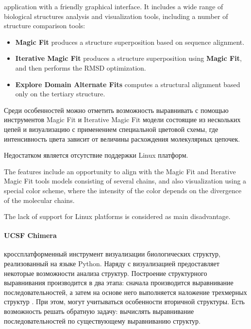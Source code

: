 \documentclass[a4paper, 12pt, titlepage, utf8]{extarticle}
\begin{document}
\begin{original}
\begin{original}
application with a friendly graphical interface. It includes a wide range of
biological structures analysis and visualization tools, including a number of
structure comparison tools:
\begin{itemize}
    \item \textbf{Magic Fit} produces a structure superposition based on
sequence alignment.
    \item \textbf{Iterative Magic Fit} produces a structure superposition using
\textbf{Magic Fit}, and then performs the RMSD optimization.
    \item \textbf{Explore Domain Alternate Fits} computes a structural alignment
based only on the tertiary structure.
\end{itemize}

\begin{original}
Среди особенностей можно отметить возможность выравнивать с помощью инструментов
Magic Fit и Iterative Magic Fit модели состоящие из нескольких цепей и
визуализацию с применением специальной цветовой схемы, где интенсивность цвета
зависит от величины расхождения молекулярных цепочек.

Недостатком является отсутствие поддержки Linux платформ.
\end{original}

The features include an opportunity to align with the Magic Fit and Iterative
Magic Fit tools  models consisting of several chains, and also visualization
using a special color scheme, where the intensity of the color depends on the
divergence of the molecular chains.

The lack of support for Linux platforms is considered as main disadvantage.

\paragraph{UCSF Chimera \cite{chimera}}
\begin{original}
кроссплатформенный инструмент визуализации биологических структур, реализованный
на языке Python. Наряду с визуализацией предоставляет некоторые возможности
анализа структур. Построение структурного выравнивания производится в два этапа:
сначала производится выравнивание последовательностей, а затем на основе него
выполняется наложение трехмерных структур \cite{chimera-alignment}. При этом,
могут учитываться особенности вторичной структуры. Есть возможность решать
обратную задачу: вычислять выравнивание последовательностей по существующему
выравниванию структур.
\end{original}


\end{original}
\end{original}
\end{document}
